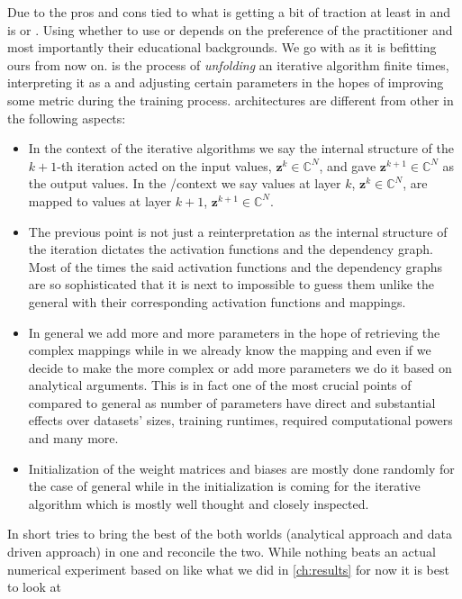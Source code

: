 Due to the pros and cons tied to \dl what is getting a bit of traction at least in \dsip and \cv is \du or \au. Using whether to use \du 
or \au depends on the preference of the practitioner and most importantly their educational backgrounds. We go with \du as it is befitting ours from now on. \du is 
the process of \emph{unfolding} an iterative algorithm finite times, interpreting it as a \nn and 
adjusting certain parameters in the hopes of improving some metric during the training process. \DU architectures are 
different from other \nns in the following aspects:
\begin{itemize}
  \item In the context of the iterative algorithms we say the internal structure of the $k+1$-th iteration acted on the input values, $\boldsymbol{z}^k \in \mathbb{C}^N$, and gave $\boldsymbol{z}^{k+1} \in \mathbb{C}^N$ 
  as the output values. In the \ml/\dl context we say values at layer $k$, $\boldsymbol{z}^k \in \mathbb{C}^N$, are mapped to values at layer $k+1$, $\boldsymbol{z}^{k+1} \in \mathbb{C}^N$.
  \item The previous point is not just a reinterpretation as the internal structure of the iteration dictates the activation functions and the dependency graph. 
  Most of the times the said activation functions and the dependency graphs are so sophisticated that it is next to impossible to guess them unlike the general \nns 
  with their corresponding activation functions and mappings.
  \item In general \nns we add more and more parameters in the hope of retrieving the complex mappings while in \dl we already know the mapping 
  and even if we decide to make the \nn more complex or add more parameters we do it based on analytical arguments. This is in fact one of the most crucial points of 
  \du compared to general \nns as number of parameters have direct and substantial effects over datasets'
   sizes, training runtimes, required computational powers and many more. 
  \item Initialization of the weight matrices and biases are mostly done randomly for the case of general \nns while in the \du initialization is coming for the 
  iterative algorithm which is mostly well thought and closely inspected.   
\end{itemize}
In short \du tries to bring the best of the both worlds (analytical approach and data driven approach) in one and reconcile the two. 
While nothing beats an actual numerical experiment based on \du like what we did in \cref{ch:results} for now it is best to look at 
